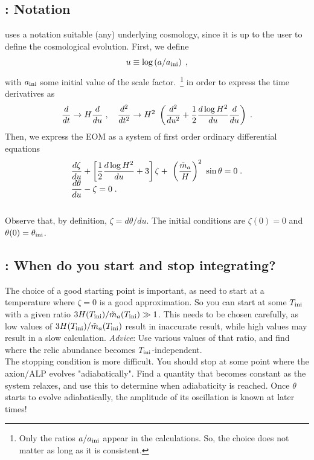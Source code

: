 \documentclass[10pt,utf8,compress,xcolor=dvipsnames]{beamer}
\begin{document}
\subsection{\mimes: Notation}
\begin{frame}{\insertsubsectionhead}
	\vspace{-0.2cm}
	\mimes uses a notation suitable (any) underlying cosmology, since it is up to the user to define the cosmological evolution.	
	First, we define 
	\begin{equation*}\vspace{-0.2cm}
		u \equiv \log \lrb{a/\ai}\;,
	\end{equation*} 
	with $a_{\rm ini}{}$ some initial value of the scale factor.~\footnote{\fontF Only the ratios $a/a_{\rm ini}{}$ appear in the calculations. So, the choice does not matter as long as it is consistent.} in order to express the time derivatives as 
	\begin{equation*}
		\dfrac{d  }{dt}  \to  H  \dfrac{d }{du} \;, 
		 \quad
		\dfrac{d^2 }{dt^2}  \to H^2 \ \left(  \dfrac{d^2 }{du^2} + \dfrac{1}{2} \dfrac{d \log H^2}{du}  \dfrac{d }{du}  \right)\;.
	\end{equation*}
	Then, we express the EOM as a system of first order ordinary differential equations
	\begin{eqnarray*}\vspace*{-0.5cm}
		& \dfrac{d  \zeta}{du} + \lrsb{\dfrac{1}{2} \dfrac{d \log H^2}{du} + 3 } \zeta + \ \lrb{\dfrac{\maT}{H}}^2 \ \sin \theta
		=0 \;. \\[-0.2cm]
		&\dfrac{d \theta}{d u} - \zeta=0 \;.
	\end{eqnarray*}\\[-0.2cm]
	Observe that, by definition, $\zeta = d\theta / du$. The initial conditions are $\zeta(0)=0$ and $\theta(0)=\theta_{\rm ini}{}$.
	
\end{frame}
\subsection{\mimes: When do you start and stop integrating?}
\begin{frame}{\insertsubsectionhead}
	The choice of a good starting point is important, as need to start at a temperature where $\zeta=0$ is a good approximation. So you can start at some $T_{\rm ini}{}$ with a given ratio $3H(T_{\rm ini}{})/\tilde m_{a}{}(T_{\rm ini}{}) \gg 1$.  This needs to be chosen carefully, as low values of $3H(T_{\rm ini}{})/\tilde m_{a}{}(T_{\rm ini}{})$ result in inaccurate result, while high values may result in a slow calculation. {\sl Advice}: Use various values of that ratio, and find where the relic abundance becomes $T_{\rm ini}{}$-independent.\\[0.5cm]
	
	The stopping condition is more difficult. You should stop at some point where the axion/ALP evolves "adiabatically". Find a quantity that becomes constant as the system relaxes, and use this to determine when adiabaticity is reached. Once $\theta$ starts to evolve adiabatically, the amplitude of its oscillation is known at later times!
\end{frame}
\end{document}
